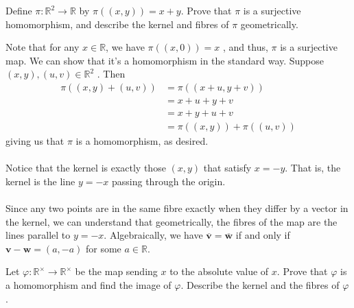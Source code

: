 \documentclass[12 pt, letterpaper]{hmcpset}
\begin{document}
\begin{problem}
	Define $\pi : \mathbb{R}^{2} \to \mathbb{R}$ by $\pi((x, y)) = x + y$. Prove that $\pi$ is a surjective homomorphism, and describe the kernel and fibres of $\pi$ geometrically.
\end{problem}

\begin{solution}
	Note that for any $x \in \mathbb{R}$, we have $\pi((x, 0)) = x$ , and thus, $\pi$  is a surjective map. We can show that it's a homomorphism in the standard way. Suppose $(x, y), (u, v) \in \mathbb{R}^{2}$ . Then 
	\[
		\begin{split}
			\pi((x, y) + (u, v)) & = \pi((x + u, y + v)) \\
					     & = x + u + y + v \\
					     & = x + y + u + v \\
					     & = \pi((x, y)) + \pi((u, v))
		\end{split}
	\]
	giving us that $\pi$ is a homomorphism, as desired. \\\\
	Notice that the kernel is exactly those $(x, y)$ that satisfy $x = - y$. That is, the kernel is the line $y = -x$ passing through the origin. \\\\
	Since any two points are in the same fibre exactly when they differ by a vector in the kernel, we can understand that geometrically, the fibres of the map are the lines parallel to $y = -x$. Algebraically, we have $\overline{\mathbf{v}} = \overline{\mathbf{w}}$ if and only if $\mathbf{v} - \mathbf{w} = (a, -a)$ for some $a \in \mathbb{R}$.
\end{solution}

\pagebreak

\begin{problem}
	Let $\varphi : \mathbb{R}^{\times} \to \mathbb{R}^{\times}$ be the map sending $x$ to the absolute value of $x$. Prove that $\varphi$ is a homomorphism and find the image of $\varphi$. Describe the kernel and the fibres of $\varphi$.
\end{problem}
\end{document}
